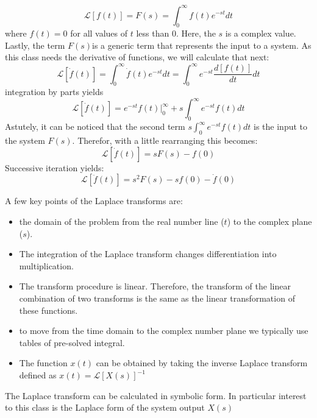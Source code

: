 \documentclass[12pt,letter]{article}
\numberwithin{ex}{section} %
\numberwithin{re}{section} %
\newcommand{\Laplace}[1]{\ensuremath{\mathcal{L}{\left[#1\right]}}}
\begin{document}
		\begin{equation}
				\Laplace{f(t)} = F(s) = \int_{0}^{\infty} f(t)e^{-st}dt
		\end{equation}
		where $f(t)=0$ for all values of $t$ less than 0. Here, the $s$ is a complex value. Lastly, the term $F(s)$is a generic term that  represents the input to a system. As this class needs the derivative of functions, we will calculate that next:
		\begin{equation}
			\Laplace{\dot{f}(t)} = \int_{0}^{\infty} \dot{f}(t)e^{-st}dt = \int_{0}^{\infty} e^{-st}\frac{d[f(t)]}{dt}dt 
		\end{equation}		
		integration by parts yields
		\begin{equation}
			\Laplace{\dot{f}(t)} = e^{-st}f(t)\Big|_0^\infty+s\int_{0}^{\infty}e^{-st}f(t)dt
		\end{equation}
		Astutely, it can be noticed that the second term $s\int_{0}^{\infty}e^{-st}f(t)dt$
		is the input to the system $F(s)$. Therefor, with a little rearranging this becomes:
		\begin{equation}
			\Laplace{\dot{f}(t)} = sF(s)-f(0)
		\end{equation}
		Successive iteration yields:
		\begin{equation}
			\Laplace{\ddot{f}(t)} = s^2F(s)-sf(0)-\dot{f}(0)
		\end{equation}
		
		A few key points of the Laplace transforms are:
		
		
		\begin{itemize}
			\item the domain of the problem from the real number line ($t$) to the complex plane ($s$).
			\item The integration of the Laplace transform changes differentiation into multiplication.
			\item The transform procedure is linear. Therefore, the transform of the linear combination of two transforms is the same as the linear transformation of these functions. 
			\item to move from the time domain to the complex number plane we typically use tables of pre-solved integral. 
			\item The function $x(t)$ can be obtained by taking the inverse Laplace transform defined as $x(t) = \Laplace{X(s)}^{-1}$
		\end{itemize}
		
		The Laplace transform can be calculated in symbolic form. In particular interest to this class is the Laplace form of the system output $X(s)$
\end{document}
